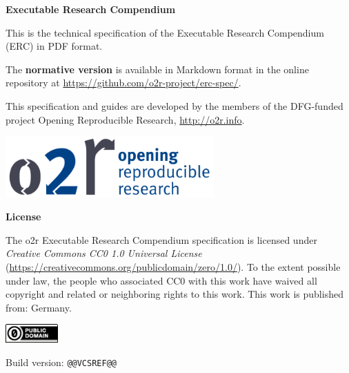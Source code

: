 \begin{titlepage}
    {\raggedleft
        \textbf{\Large Executable Research Compendium}\\
    }
    \vspace{\fill}
	
    This is the technical specification of the Executable Research Compendium (ERC) in PDF format.

    The \textbf{normative version} is available in Markdown format in the online repository at \url{https://github.com/o2r-project/erc-spec/}.

    This specification and guides are developed by the members of the DFG-funded project Opening Reproducible Research, \url{http://o2r.info}.

    \vspace{1cm}
    \begin{center}
        \includegraphics[width=8cm]{docs/o2r-logo}
    \end{center}
    \vspace{3cm}

    \textbf{License}

    The o2r Executable Research Compendium specification is licensed under \emph{Creative Commons CC0 1.0 Universal License} (\url{https://creativecommons.org/publicdomain/zero/1.0/}).
    To the extent possible under law, the people who associated CC0 with this work have waived all copyright and related or neighboring rights to this work.
    This work is published from: Germany.

    \includegraphics[width=2cm]{docs/cc-zero}

    Build version: \texttt{@@VCSREF@@}
 
\end{titlepage}
